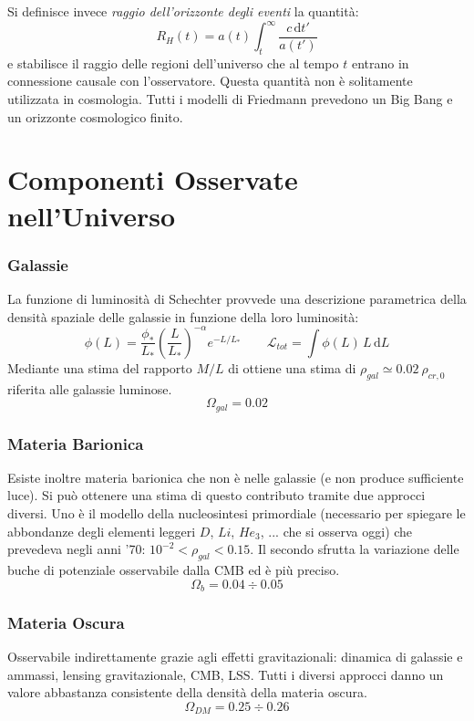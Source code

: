 Si definisce invece \textit{raggio dell'orizzonte degli eventi} la quantità:
\begin{equation}
     R_H (t) = a(t) \int_t^\infty \frac{c\, \mathrm{d}t'}{a(t')}
\end{equation}
e stabilisce il raggio delle regioni dell'universo che al tempo $t$ entrano in connessione causale con l'osservatore. Questa quantità non è solitamente utilizzata in cosmologia. Tutti i modelli di Friedmann prevedono un Big Bang e un orizzonte cosmologico finito.

\section{Componenti Osservate nell'Universo}

\subsubsection{Galassie}
La funzione di luminosità di Schechter provvede una descrizione parametrica della densità spaziale delle galassie in funzione della loro luminosità:
$$
\phi (L) = \frac{\phi_*}{L_*} \left ( \frac{L}{L_*}  \right)^{-\alpha}e^{-L/L_*}\qquad \mathcal{L}_{tot}=\int \phi (L) \, L \, \mathrm{d}L
$$
Mediante una stima del rapporto $M/L$ di ottiene una stima di $\rho_{gal} \simeq 0.02\: \rho_{cr,0}$ riferita alle galassie luminose.
\begin{equation}
    \Omega_{gal}=0.02
\end{equation}

\subsubsection{Materia Barionica}
Esiste inoltre materia barionica che non è nelle galassie (e non produce sufficiente luce). Si può ottenere una stima di questo contributo tramite due approcci diversi. Uno è il modello della nucleosintesi primordiale (necessario per spiegare le abbondanze degli elementi leggeri $D$, $Li$, $He_3$, ... che si osserva oggi) che prevedeva negli anni '70: $10^{-2}<\rho_{gal} < 0.15$. Il secondo sfrutta la variazione delle buche di potenziale osservabile dalla CMB ed è più preciso.
\begin{equation}
    \Omega_{b}=0.04 \div 0.05
\end{equation}

\subsubsection{Materia Oscura}
Osservabile indirettamente grazie agli effetti gravitazionali: dinamica di galassie e ammassi, lensing gravitazionale, CMB, LSS. Tutti i diversi approcci danno un valore abbastanza consistente della densità della materia oscura.
\begin{equation}
    \Omega_{DM}=0.25 \div 0.26
\end{equation}

